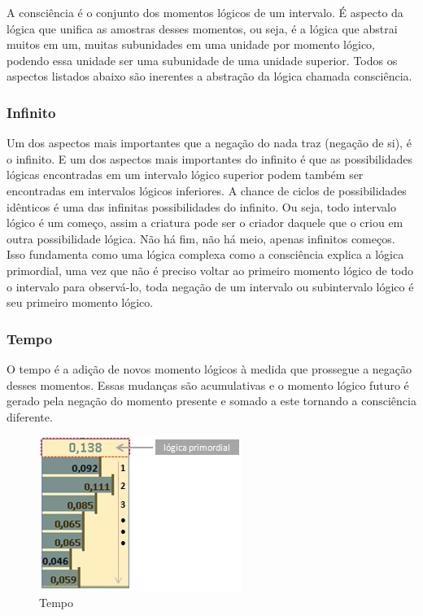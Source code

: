 A consciência é o conjunto dos momentos lógicos de um intervalo. É aspecto da lógica que unifica as amostras desses momentos, ou seja, é a lógica que abstrai muitos em um, muitas subunidades em uma unidade por momento lógico, podendo essa unidade ser uma subunidade de uma unidade superior. Todos os aspectos listados abaixo são inerentes a abstração da lógica chamada consciência.

\subsubsection{Infinito}
Um dos aspectos mais importantes que a negação do nada traz (negação de si), é o infinito. E um dos aspectos mais importantes do infinito é que as possibilidades lógicas encontradas em um intervalo lógico superior podem também ser encontradas em intervalos lógicos inferiores. A chance de ciclos de possibilidades idênticos é uma das infinitas possibilidades do infinito. Ou seja, todo intervalo lógico é um começo, assim a criatura pode ser o criador daquele que o criou em outra possibilidade lógica. Não há fim, não há meio, apenas infinitos começos. Isso fundamenta como uma lógica complexa como a consciência explica a lógica primordial, uma vez que não é preciso voltar ao primeiro momento lógico de todo o intervalo para observá-lo, toda negação de um intervalo  ou subintervalo lógico é seu primeiro momento lógico.

\subsubsection{Tempo}
O tempo é a adição de novos momento lógicos à medida que prossegue a negação desses momentos.  Essas mudanças são acumulativas e o momento lógico futuro é gerado pela negação do momento presente e somado a este tornando a consciência diferente.

\begin{figure}[H]
\caption{Tempo}
\label{fig:consciousness_time}
\centering
\includegraphics[scale=1]{sections/images/consciousness_time.jpg}
\end{figure}

